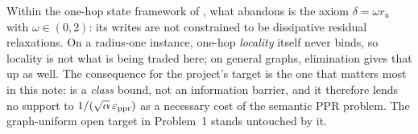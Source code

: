 \begin{remark}
\label{rem:ladder-elimination-scope}
Within the one-hop state framework of , what
 abandons is the axiom
$\delta=\omega r_u$ with $\omega\in(0,2)$: its writes are not constrained to
be dissipative residual relaxations. On a radius-one instance, one-hop
\emph{locality} itself never binds, so locality is not what is being traded
here; on general graphs, elimination gives that up as well. The consequence
for the project's target is the one that matters most in this note:
 is a \emph{class} bound, not an
information barrier, and it therefore lends no support to
$1/(\sqrt\alpha\,\varepsilon_{\mathrm{ppr}})$ as a necessary cost of the semantic PPR problem.
The graph-uniform open target in Problem~1 stands untouched by it.
\end{remark}
